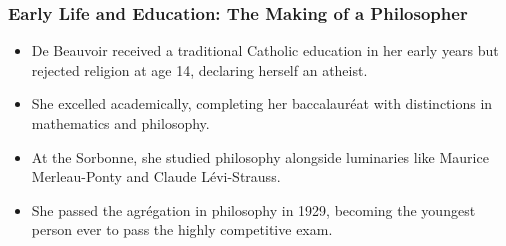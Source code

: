 \documentclass[aspectratio=169]{beamer}
\begin{document}
	\begin{frame}
		\frametitle{Early Life and Education: The Making of a Philosopher}
		\begin{itemize}
			\item De Beauvoir received a traditional Catholic education in her early years but rejected religion at age 14, declaring herself an atheist.
			\item She excelled academically, completing her baccalauréat with distinctions in mathematics and philosophy.
			\item At the Sorbonne, she studied philosophy alongside luminaries like Maurice Merleau-Ponty and Claude Lévi-Strauss.
			\item She passed the agrégation in philosophy in 1929, becoming the youngest person ever to pass the highly competitive exam.
		\end{itemize}
		
		\begin{center}
		\end{center}
	\end{frame}
	
\end{document}
